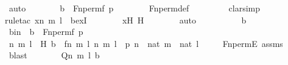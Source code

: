 \begin{isabellebody}
\ auto\isanewline
\ \ \ \ \isamarkupfalse%
\ \isamarkupfalse%
\ {\isachardoublequoteopen}b\ {\isasymin}\ Fn{\isacharunderscore}{\kern0pt}perm{\isacharparenleft}{\kern0pt}f{\isacharcomma}{\kern0pt}\ p{\isacharparenright}{\kern0pt}{\isachardoublequoteclose}\isanewline
\ \ \ \ \ \ \isamarkupfalse%
\ Fn{\isacharunderscore}{\kern0pt}perm{\isacharunderscore}{\kern0pt}def\ \isanewline
\ \ \ \ \ \ \isamarkupfalse%
\ clarsimp\isanewline
\ \ \ \ \ \ \isamarkupfalse%
{\isacharparenleft}{\kern0pt}rule{\isacharunderscore}{\kern0pt}tac\ x{\isacharequal}{\kern0pt}{\isachardoublequoteopen}{\isacharless}{\kern0pt}{\isacharless}{\kern0pt}n{\isacharcomma}{\kern0pt}\ m{\isachargreater}{\kern0pt}{\isacharcomma}{\kern0pt}\ l{\isachargreater}{\kern0pt}{\isachardoublequoteclose}\ \ bexI{\isacharparenright}{\kern0pt}\isanewline
\ \ \ \ \ \ \isamarkupfalse%
\ xH\ H\isanewline
\ \ \ \ \ \ \isamarkupfalse%
\ auto\isanewline
\ \ \isamarkupfalse%
\ \isanewline
\ \ \ \ \isamarkupfalse%
\ b\ \isanewline
\ \ \ \ \isamarkupfalse%
\ bin\ {\isacharcolon}{\kern0pt}\ {\isachardoublequoteopen}b\ {\isasymin}\ Fn{\isacharunderscore}{\kern0pt}perm{\isacharparenleft}{\kern0pt}f{\isacharcomma}{\kern0pt}\ p{\isacharparenright}{\kern0pt}{\isachardoublequoteclose}\isanewline
\ \ \ \ \isamarkupfalse%
\ \isamarkupfalse%
\ n\ m\ l\ \ H{\isacharcolon}{\kern0pt}\ {\isachardoublequoteopen}b\ {\isacharequal}{\kern0pt}\ {\isacharless}{\kern0pt}{\isacharless}{\kern0pt}f{\isacharbackquote}{\kern0pt}n{\isacharcomma}{\kern0pt}\ m{\isachargreater}{\kern0pt}{\isacharcomma}{\kern0pt}\ l{\isachargreater}{\kern0pt}{\isachardoublequoteclose}\ {\isachardoublequoteopen}{\isacharless}{\kern0pt}{\isacharless}{\kern0pt}n{\isacharcomma}{\kern0pt}\ m{\isachargreater}{\kern0pt}{\isacharcomma}{\kern0pt}\ l{\isachargreater}{\kern0pt}\ {\isasymin}\ p{\isachardoublequoteclose}\ {\isachardoublequoteopen}n\ {\isasymin}\ nat{\isachardoublequoteclose}\ {\isachardoublequoteopen}m\ {\isasymin}\ nat{\isachardoublequoteclose}\ {\isachardoublequoteopen}l\ {\isasymin}\ {}{\isachardoublequoteclose}\ \ \isamarkupfalse%
\ Fn{\isacharunderscore}{\kern0pt}permE\ assms\ \isamarkupfalse%
\ blast\isanewline
\ \ \ \ \isamarkupfalse%
\ \isamarkupfalse%
\ {\isachardoublequoteopen}Q{\isacharparenleft}{\kern0pt}{\isacharless}{\kern0pt}{\isacharless}{\kern0pt}n{\isacharcomma}{\kern0pt}\ m{\isachargreater}{\kern0pt}{\isacharcomma}{\kern0pt}\ l{\isachargreater}{\kern0pt}{\isacharcomma}{\kern0pt}\ b{\isacharparenright}{\kern0pt}{\isachardoublequoteclose}\isanewline

\end{isabellebody}
